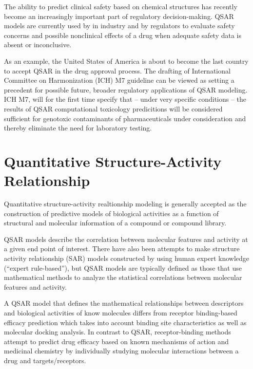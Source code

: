 The ability to predict clinical safety based on chemical structures has recently become an increasingly important part of regulatory decision-making. QSAR models are currently used by in industry and by regulators to evaluate safety concerns and possible nonclinical effects of a drug when adequate safety data is absent or inconclusive. \cite{Kruhlak2012}

As an example, the United States of America is about to become the last country to accept QSAR in the drug approval process. The drafting of International Committee on Harmonization (ICH) M7 guideline can be viewed as setting a precedent for possible future, broader regulatory applications of QSAR modeling. ICH M7, will for the first time specify that -- under very specific conditions -- the results of QSAR computational toxicology predicitions will be considered sufficient for genotoxic contaminants of pharmaceuticals under consideration and thereby eliminate the need for laboratory testing. \cite{Kruhlak2012}


\section{Quantitative Structure-Activity Relationship}

Quantitative structure-activity realtionship modeling is generally accepted as the construction of predictive models of biological activities as a function of structural and molecular information of a compound or compound library. \cite{Nantasenamat2009}

QSAR models describe the correlation between molecular features and activity at a given end point of interest. There have also been attempts to make structure activity relationship (SAR) models constructed by using human expert knowledge (“expert rule-based”), but QSAR models are typically defined as those that use mathematical methods to analyze the statistical correlations between molecular features and activity. 

A QSAR model that defines the mathematical relationships between descriptors and biological activities of know molecules differs from receptor binding-based efficacy prediction which takes into account binding site characteristics as well as molecular docking analysis. In contrast to QSAR, receptor-binding methods attempt to predict drug efficacy based on known mechanisms of action and medicinal chemistry by individually studying molecular interactions between a drug and targets/receptors. \cite{Kruhlak2012}

